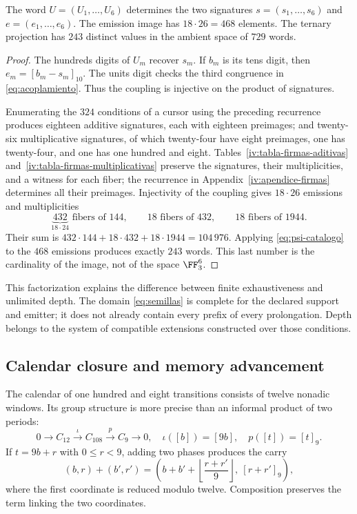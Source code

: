 \begin{proposition}
The word \(U=(U_1,\ldots,U_6)\) determines the two signatures \(s=(s_1,\ldots,s_6)\) and \(e=(e_1,\ldots,e_6)\). The emission image has \(18\cdot26=468\) elements. The ternary projection has \(243\) distinct values in the ambient space of \(729\) words.
\end{proposition}
\begin{proof}
The hundreds digits of \(U_m\) recover \(s_m\). If \(b_m\) is its tens digit, then \(e_m=[b_m-s_m]_{10}\). The units digit checks the third congruence in \eqref{eq:acoplamiento}. Thus the coupling is injective on the product of signatures.

Enumerating the \(324\) conditions of a cursor using the preceding recurrence produces eighteen additive signatures, each with eighteen preimages; and twenty-six multiplicative signatures, of which twenty-four have eight preimages, one has twenty-four, and one has one hundred and eight. Tables~\ref{iv:tabla-firmas-aditivas}
and~\ref{iv:tabla-firmas-multiplicativas} preserve the signatures,
their multiplicities, and a witness for each fiber; the recurrence in
Appendix~\ref{iv:apendice-firmas} determines all their preimages. Injectivity of the coupling gives \(18\cdot26\) emissions and multiplicities
\[
 \underbrace{432}_{18\cdot24}\text{ fibers of }144,
 \qquad18\text{ fibers of }432,
 \qquad18\text{ fibers of }1944.
\]
Their sum is \(432\cdot144+18\cdot432+18\cdot1944=104\,976\). Applying \eqref{eq:psi-catalogo} to the \(468\) emissions produces exactly \(243\) words. This last number is the cardinality of the image, not of the space \(\FF_3^6\).
\end{proof}

This factorization explains the difference between finite exhaustiveness and unlimited depth. The domain \eqref{eq:semillas} is complete for the declared support and emitter; it does not already contain every prefix of every prolongation. Depth belongs to the system of compatible extensions constructed over those conditions.

\subsection{Calendar closure and memory advancement}

The calendar of one hundred and eight transitions consists of twelve nonadic windows. Its group structure is more precise than an informal product of two periods:
\begin{equation}
 0\longrightarrow C_{12}\xrightarrow{\iota}C_{108}
 \xrightarrow{p}C_9\longrightarrow0,
 \quad\iota([b])=[9b],\quad p([t])=[t]_9.
 \label{eq:extension108}
\end{equation}
If \(t=9b+r\) with \(0\le r<9\), adding two phases produces the carry
\[
 (b,r)+(b',r')=
 \left(b+b'+\left\lfloor\frac{r+r'}9\right\rfloor,\ [r+r']_9\right),
\]
where the first coordinate is reduced modulo twelve. Composition preserves the term linking the two coordinates.

